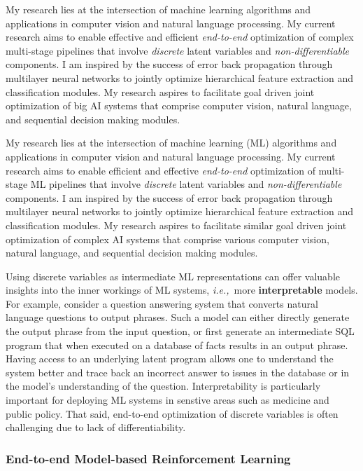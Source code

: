 \documentclass[a4paper, 10pt]{article}
\def\ie{{\em i.e.,}}
\newcommand{\figref}[1]{Figure~\ref{#1}}
\begin{document}
My research lies at the intersection of machine learning algorithms
and applications in computer vision and natural language processing.
My current research aims to enable effective and efficient {\em                                                                                            
  end-to-end} optimization of complex multi-stage pipelines that
involve {\em discrete} latent variables and {\em non-differentiable}
components.  I am inspired by the success of error back propagation
through multilayer neural networks to jointly optimize hierarchical
feature extraction and classification modules. My research aspires
to facilitate goal driven joint optimization of big AI systems that
comprise computer vision, natural language, and sequential decision
making modules.

My research lies at the intersection of machine learning (ML)
algorithms and applications in computer vision and natural language
processing.  My current research aims to enable efficient and
effective {\em end-to-end} optimization of multi-stage ML pipelines
that involve {\em discrete} latent variables and {\em
  non-differentiable} components.  I am inspired by the success of
error back propagation through multilayer neural networks to jointly
optimize hierarchical feature extraction and classification modules.
My research aspires to facilitate similar
goal driven joint optimization of complex AI systems that comprise
various computer vision, natural language, and sequential decision
making modules.

Using discrete variables as intermediate ML representations can offer
valuable insights into the inner workings of ML systems, \ie~more {\bf
  interpretable} models. For example, consider a question answering
system that converts natural language questions to output
phrases. Such a model can either directly generate the output phrase
from the input question, or first generate an intermediate SQL program
that when executed on a database of facts results in an output
phrase. Having access to an underlying latent program allows one to
understand the system better and trace back an incorrect answer to
issues in the database or in the model's understanding of the
question. Interpretability is particularly important for deploying ML
systems in senstive areas such as medicine and public policy. That
said, end-to-end optimization of discrete variables is often
challenging due to lack of differentiability.

\subsubsection*{End-to-end Model-based Reinforcement Learning}
\end{document}
